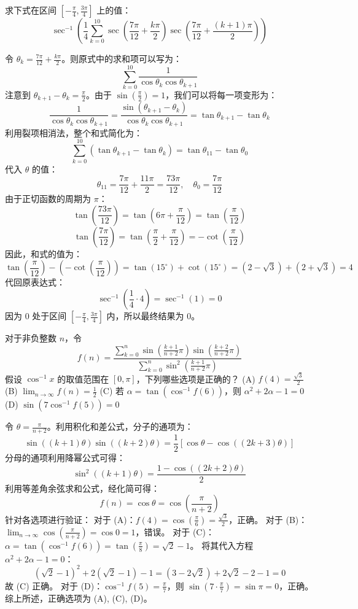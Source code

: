 \begin{questions}
    \question 求下式在区间 $[-\frac{\pi}{4}, \frac{3\pi}{4}]$ 上的值：
\[
\sec^{-1}\left(\frac{1}{4} \sum_{k=0}^{10} \sec\left(\frac{7\pi}{12} + \frac{k\pi}{2}\right) \sec\left(\frac{7\pi}{12} + \frac{(k+1)\pi}{2}\right)\right)
\]

\begin{solution}
令 $\theta_k = \frac{7\pi}{12} + \frac{k\pi}{2}$。则原式中的求和项可以写为：
\[
\sum_{k=0}^{10} \frac{1}{\cos \theta_k \cos \theta_{k+1}}
\]
注意到 $\theta_{k+1} - \theta_k = \frac{\pi}{2}$。由于 $\sin(\frac{\pi}{2}) = 1$，我们可以将每一项变形为：
\[
\frac{1}{\cos \theta_k \cos \theta_{k+1}} = \frac{\sin(\theta_{k+1} - \theta_k)}{\cos \theta_k \cos \theta_{k+1}} = \tan \theta_{k+1} - \tan \theta_k
\]
利用裂项相消法，整个和式简化为：
\[
\sum_{k=0}^{10} (\tan \theta_{k+1} - \tan \theta_k) = \tan \theta_{11} - \tan \theta_0
\]
代入 $\theta$ 的值：
\[
\theta_{11} = \frac{7\pi}{12} + \frac{11\pi}{2} = \frac{73\pi}{12}, \quad \theta_0 = \frac{7\pi}{12}
\]
由于正切函数的周期为 $\pi$：
\[
\tan\left(\frac{73\pi}{12}\right) = \tan\left(6\pi + \frac{\pi}{12}\right) = \tan\left(\frac{\pi}{12}\right)
\]
\[
\tan\left(\frac{7\pi}{12}\right) = \tan\left(\frac{\pi}{2} + \frac{\pi}{12}\right) = -\cot\left(\frac{\pi}{12}\right)
\]
因此，和式的值为：
\[
\tan\left(\frac{\pi}{12}\right) - \left(-\cot\left(\frac{\pi}{12}\right)\right) = \tan\left(15^\circ\right) + \cot\left(15^\circ\right) = (2-\sqrt{3}) + (2+\sqrt{3}) = 4
\]
代回原表达式：
\[
\sec^{-1}\left(\frac{1}{4} \cdot 4\right) = \sec^{-1}(1) = 0
\]
因为 $0$ 处于区间 $[-\frac{\pi}{4}, \frac{3\pi}{4}]$ 内，所以最终结果为 $0$。
\end{solution}
    \question 对于非负整数 $n$，令
\[
f(n) = \frac{\sum_{k=0}^{n} \sin\left(\frac{k+1}{n+2}\pi\right) \sin\left(\frac{k+2}{n+2}\pi\right)}{\sum_{k=0}^{n} \sin^2\left(\frac{k+1}{n+2}\pi\right)}
\]
假设 $\cos^{-1}x$ 的取值范围在 $[0, \pi]$，下列哪些选项是正确的？
(A) $f(4) = \frac{\sqrt{3}}{2}$
(B) $\lim_{n \to \infty} f(n) = \frac{1}{2}$
(C) 若 $\alpha = \tan(\cos^{-1}f(6))$，则 $\alpha^2 + 2\alpha - 1 = 0$
(D) $\sin(7 \cos^{-1}f(5)) = 0$

\begin{solution}
令 $\theta = \frac{\pi}{n+2}$。利用积化和差公式，分子的通项为：
\[
\sin((k+1)\theta)\sin((k+2)\theta) = \frac{1}{2}[\cos\theta - \cos((2k+3)\theta)]
\]
分母的通项利用降幂公式可得：
\[
\sin^2((k+1)\theta) = \frac{1-\cos((2k+2)\theta)}{2}
\]
利用等差角余弦求和公式，经化简可得：
\[
f(n) = \cos\theta = \cos\left(\frac{\pi}{n+2}\right)
\]
针对各选项进行验证：
对于 (A)：$f(4) = \cos\left(\frac{\pi}{6}\right) = \frac{\sqrt{3}}{2}$，正确。
对于 (B)：$\lim_{n \to \infty} \cos\left(\frac{\pi}{n+2}\right) = \cos 0 = 1$，错误。
对于 (C)：$\alpha = \tan(\cos^{-1}f(6)) = \tan\left(\frac{\pi}{8}\right) = \sqrt{2}-1$。
将其代入方程 $\alpha^2 + 2\alpha - 1 = 0$：
\[
(\sqrt{2}-1)^2 + 2(\sqrt{2}-1) - 1 = (3-2\sqrt{2}) + 2\sqrt{2} - 2 - 1 = 0
\]
故 (C) 正确。
对于 (D)：$\cos^{-1}f(5) = \frac{\pi}{7}$，则 $\sin(7 \cdot \frac{\pi}{7}) = \sin\pi = 0$，正确。
综上所述，正确选项为 (A), (C), (D)。
\end{solution}


\end{questions}
